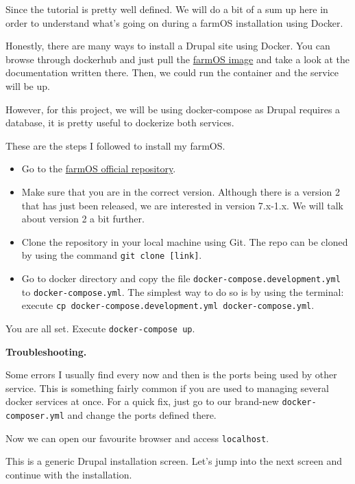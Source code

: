 Since the tutorial is pretty well defined. We will do a bit of a sum up here in order to understand what's going on during a farmOS installation using Docker.

Honestly, there are many ways to install a Drupal site using Docker. You can browse through dockerhub\cite{dockerhub} and just pull the \href{https://hub.docker.com/r/farmos/farmos}{farmOS image} and take a look at the documentation written there. Then, we could run the container and the service will be up.

However, for this project, we will be using docker-compose as Drupal requires a database, it is pretty useful to dockerize both services.

\vspace{7mm}
These are the steps I followed to install my farmOS.
\begin{itemize}
    \item Go to the \href{https://github.com/farmOS/farmOS}{farmOS official repository}.
    \item Make sure that you are in the correct version. Although there is a version 2 that has just been released, we are interested in version 7.x-1.x. We will talk about version 2 a bit further.
    \item Clone the repository in your local machine using Git. The repo can be cloned by using the command \verb|git clone [link]|.
    \item Go to docker directory and copy the file \verb|docker-compose.development.yml| to \verb|docker-compose.yml|. The simplest way to do so is by using the terminal: execute \verb|cp docker-compose.development.yml docker-compose.yml|.
\end{itemize}

You are all set. Execute \verb|docker-compose up|.

\vspace{7mm}
\textbf{Troubleshooting.}

Some errors I usually find every now and then is the ports being used by other service. This is something fairly common if you are used to managing several docker services at once. For a quick fix, just go to our brand-new \verb|docker-composer.yml| and change the ports defined there.

\vspace{7mm}
Now we can open our favourite browser and access \verb|localhost|.

This is a generic Drupal installation screen. Let's jump into the next screen and continue with the installation.

